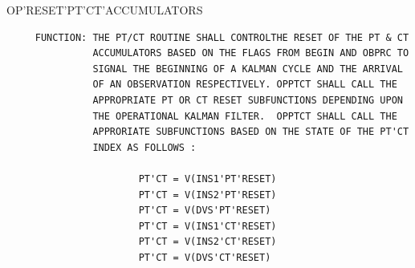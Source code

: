 \begin{frame}
OP'RESET'PT'CT'ACCUMULATORS
\begin{verbatim}
     FUNCTION: THE PT/CT ROUTINE SHALL CONTROLTHE RESET OF THE PT & CT
               ACCUMULATORS BASED ON THE FLAGS FROM BEGIN AND OBPRC TO
               SIGNAL THE BEGINNING OF A KALMAN CYCLE AND THE ARRIVAL
               OF AN OBSERVATION RESPECTIVELY. OPPTCT SHALL CALL THE
               APPROPRIATE PT OR CT RESET SUBFUNCTIONS DEPENDING UPON
               THE OPERATIONAL KALMAN FILTER.  OPPTCT SHALL CALL THE
               APPRORIATE SUBFUNCTIONS BASED ON THE STATE OF THE PT'CT
               INDEX AS FOLLOWS :

                       PT'CT = V(INS1'PT'RESET)
                       PT'CT = V(INS2'PT'RESET)
                       PT'CT = V(DVS'PT'RESET)
                       PT'CT = V(INS1'CT'RESET)
                       PT'CT = V(INS2'CT'RESET)
                       PT'CT = V(DVS'CT'RESET)

\end{verbatim}
\end{frame}
